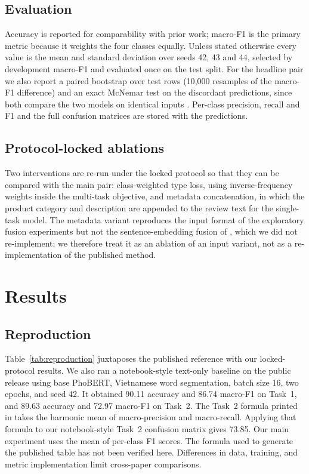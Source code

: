 \documentclass[12pt,a4paper]{article}
\begin{document}
\subsection{Evaluation}
Accuracy is reported for comparability with prior work; macro-F1 is the primary metric because it weights the four classes equally. Unless stated otherwise every value is the mean and standard deviation over seeds 42, 43 and 44, selected by development macro-F1 and evaluated once on the test split. For the headline pair we also report a paired bootstrap over test rows (10{,}000 resamples of the macro-F1 difference) and an exact McNemar test on the discordant predictions, since both compare the two models on identical inputs \cite{efron1979,dietterich1998}. Per-class precision, recall and F1 and the full confusion matrices are stored with the predictions.

\subsection{Protocol-locked ablations}
Two interventions are re-run under the locked protocol so that they can be compared with the main pair: class-weighted type loss, using inverse-frequency weights inside the multi-task objective, and metadata concatenation, in which the product category and description are appended to the review text for the single-task model. The metadata variant reproduces the input format of the exploratory fusion experiments but not the sentence-embedding fusion of \cite{vispam2024}, which we did not re-implement; we therefore treat it as an ablation of an input variant, not as a re-implementation of the published method.

\section{Results}
\label{sec:results}











\subsection{Reproduction}
Table~\ref{tab:reproduction} juxtaposes the published reference with our locked-protocol results. We also ran a notebook-style text-only baseline on the public release using base PhoBERT, Vietnamese word segmentation, batch size 16, two epochs, and seed 42. It obtained 90.11 accuracy and 86.74 macro-F1 on Task~1, and 89.63 accuracy and 72.97 macro-F1 on Task~2. The Task~2 formula printed in \cite{vispam2024} takes the harmonic mean of macro-precision and macro-recall. Applying that formula to our notebook-style Task~2 confusion matrix gives 73.85. Our main experiment uses the mean of per-class F1 scores. The formula used to generate the published table has not been verified here. Differences in data, training, and metric implementation limit cross-paper comparisons.
\end{document}
